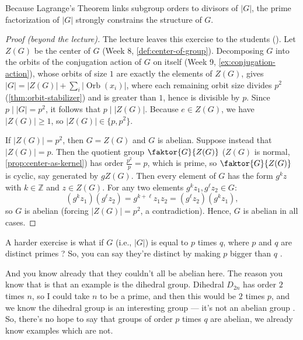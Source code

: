 \begin{content}
Because Lagrange's Theorem links subgroup orders to divisors of $|G|$, the prime factorization of $|G|$ strongly constrains the structure of $G$.


\begin{proof}[Proof (beyond the lecture)]
The lecture leaves this exercise to the students (). Let $Z(G)$ be the center of $G$ (Week 8, \cref{def:center-of-group}). Decomposing $G$ into the orbits of the conjugation action of $G$ on itself (Week 9, \cref{ex:conjugation-action}), whose orbits of size $1$ are exactly the elements of $Z(G)$, gives $|G| = |Z(G)| + \sum_i |\operatorname{Orb}(x_i)|$, where each remaining orbit size divides $p^2$ (\cref{thm:orbit-stabilizer}) and is greater than $1$, hence is divisible by $p$. Since $p \mid |G| = p^2$, it follows that $p \mid |Z(G)|$. Because $e \in Z(G)$, we have $|Z(G)| \ge 1$, so $|Z(G)| \in \{p, p^2\}$.

If $|Z(G)| = p^2$, then $G = Z(G)$ and $G$ is abelian. Suppose instead that $|Z(G)| = p$. Then the quotient group $\faktor{G}{Z(G)}$ ($Z(G)$ is normal, \cref{prop:center-as-kernel}) has order $\frac{p^2}{p} = p$, which is prime, so $\faktor{G}{Z(G)}$ is cyclic, say generated by $g Z(G)$. Then every element of $G$ has the form $g^k z$ with $k \in \mathbb{Z}$ and $z \in Z(G)$. For any two elements $g^k z_1, g^\ell z_2 \in G$:
\[
(g^k z_1)(g^\ell z_2) = g^{k+\ell} z_1 z_2 = (g^\ell z_2)(g^k z_1),
\]
so $G$ is abelian (forcing $|Z(G)| = p^2$, a contradiction). Hence, $G$ is abelian in all cases.
\end{proof}
\end{content}

\begin{speech}[00:28:49 - 00:29:36]
A harder exercise is what if $G$ (i.e., $|G|$) is equal to $p$ times $q$, where $p$ and $q$ are distinct primes ? So, you can say they're distinct by making $p$ bigger than $q$ .

And you know already that they couldn't all be abelian here. The reason you know that is that an example is the dihedral group. Dihedral $D_{2n}$ has order $2$ times $n$, so I could take $n$ to be a prime, and then this would be $2$ times $p$, and we know the dihedral group is an interesting group --- it's not an abelian group . So, there's no hope to say that groups of order $p$ times $q$ are abelian, we already know examples which are not.
\end{speech}

